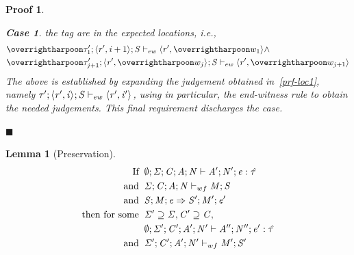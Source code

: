 \documentclass[showabstract,showacknowledgments,showpreface,showdedication]{iuphd}
\newtheorem{lemma}[theorem]{Lemma}
\newtheorem*{bcase}{Case}
\theoremstyle{nonumberplain}
\newtheorem{nproof}{Proof}
\begin{document}
\begin{nproof}
\begin{bcase}
    the tag are in the expected locations, i.e.,
        \begin{align*}
    & \ewitness{\overharpoon{\TYP'_{1}}}{\concreteloc{\reg'}{\ind + 1}{}}{\STOR}{\concreteloc{\reg'}{\overharpoon{w_1}}{}} \wedge \\
    & \ewitness{\overharpoon{\TYP'_{j+1}}}{\concreteloc{\reg'}{\overharpoon{w_j}}{}}{\STOR}{\concreteloc{\reg'}{\overharpoon{w_{j+1}}}{}}
    \end{align*}
    The above is established by expanding the judgement obtained in~\ref{prf-loc1}, namely
    $\mathit{\tau}';\langle \mathit{r}', \mathit{i} \rangle ^{};\mathit{S} \vdash_{ew} \langle \mathit{r}', \mathit{i}' \rangle ^{}$,
    using in particular, the end-witness rule
     to obtain the
    needed judgements.
    This final requirement discharges the case.
  \end{bcase}
    
$\blacksquare$

\end{nproof}

\begin{lemma}[Preservation]
  \label{lemma:preservation}
  \begin{displaymath}
    \begin{aligned}
      \text{If} \;\; & \emptyset;\mathit{\Sigma};\mathit{C};\mathit{A};\mathit{N} \vdash \mathit{A}';\mathit{N}';\mathit{e} : \mathit{\hat{\tau}} \\
      \text{and} \;\; & \mathit{\Sigma};\mathit{C};\mathit{A};\mathit{N} \vdash_{wf} \mathit{M};\mathit{S}\\
      \text{and} \;\; & \mathit{S};\mathit{M};\mathit{e} \Rightarrow \mathit{S}';\mathit{M}';\mathit{e}' \\
      \text{then for some} \;\; & \mathit{\Sigma}' \supseteq \mathit{\Sigma}, \mathit{C}' \supseteq \mathit{C} ,\\
      & \emptyset;\mathit{\Sigma}';\mathit{C}';\mathit{A}';\mathit{N}' \vdash \mathit{A}'';\mathit{N}'';\mathit{e}' : \mathit{\hat{\tau}} \\
      \text{and} \;\; & \mathit{\Sigma}';\mathit{C}';\mathit{A}';\mathit{N}' \vdash_{wf} \mathit{M}';\mathit{S}'\\
    \end{aligned}
  \end{displaymath}
\end{lemma}
\end{document}
